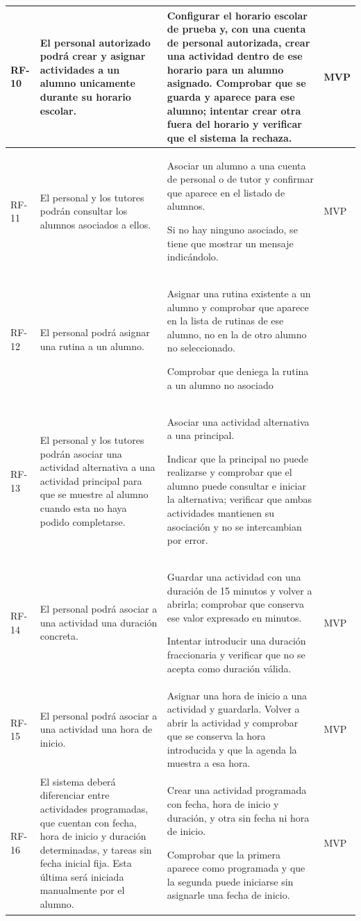 \begin{longtable}{|>{\raggedright\arraybackslash}p{1cm}|>{\raggedright\arraybackslash}p{6cm}|>{\criterioinicio}p{5.9cm}<{\criteriofin}|>{\centering\arraybackslash}p{1.8cm}|}
\hline
\hypertarget{rf-10}{}RF-10 & El personal autorizado podrá crear y asignar actividades a un alumno unicamente durante su horario escolar. & Configurar el horario escolar de prueba y, con una cuenta de personal autorizada, crear una actividad dentro de ese horario para un alumno asignado. Comprobar que se guarda y aparece para ese alumno; intentar crear otra fuera del horario y verificar que el sistema la rechaza. & MVP \\
\hline
\hypertarget{rf-11}{}RF-11 & El personal y los tutores podrán consultar los alumnos asociados a ellos. & Asociar un alumno a una cuenta de personal o de tutor y confirmar que aparece en el listado de alumnos. \item Si no hay ninguno asociado, se tiene que mostrar un mensaje indicándolo. & MVP \\
\hline
\hypertarget{rf-12}{}RF-12 & El personal podrá asignar una rutina a un alumno. & Asignar una rutina existente a un alumno y comprobar que aparece en la lista de rutinas de ese alumno, no en la de otro alumno no seleccionado. \item Comprobar que deniega la rutina a un alumno no asociado &  \\
\hline
\hypertarget{rf-13}{}RF-13 & El personal y los tutores podrán asociar una actividad alternativa a una actividad principal para que se muestre al alumno cuando esta no haya podido completarse. & Asociar una actividad alternativa a una principal. \item Indicar que la principal no puede realizarse y comprobar que el alumno puede consultar e iniciar la alternativa; verificar que ambas actividades mantienen su asociación y no se intercambian por error. &  \\
\hline
\hypertarget{rf-14}{}RF-14 & El personal podrá asociar a una actividad una duración concreta. & Guardar una actividad con una duración de 15 minutos y volver a abrirla; comprobar que conserva ese valor expresado en minutos. \item Intentar introducir una duración fraccionaria y verificar que no se acepta como duración válida. & MVP \\
\hline
\hypertarget{rf-15}{}RF-15 & El personal podrá asociar a una actividad una hora de inicio. & Asignar una hora de inicio a una actividad y guardarla. Volver a abrir la actividad y comprobar que se conserva la hora introducida y que la agenda la muestra a esa hora. & MVP \\
\hline
\hypertarget{rf-16}{}RF-16 & El sistema deberá diferenciar entre actividades programadas, que cuentan con fecha, hora de inicio y duración determinadas, y tareas sin fecha inicial fija. Esta última será iniciada manualmente por el alumno. & Crear una actividad programada con fecha, hora de inicio y duración, y otra sin fecha ni hora de inicio. \item Comprobar que la primera aparece como programada y que la segunda puede iniciarse sin asignarle una fecha de inicio. & MVP\\

\end{longtable}
